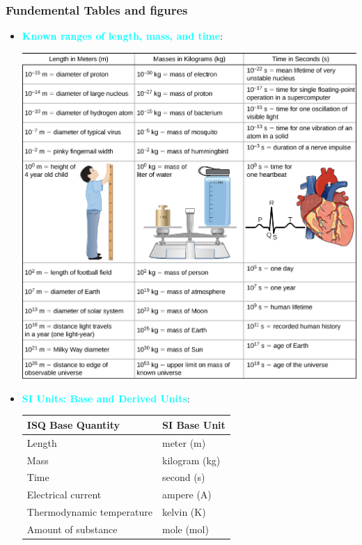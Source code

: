 \documentclass{report}
\begin{document}
    \subsubsection{Fundemental Tables and figures}
    \begin{itemize}
        \item \textbf{\textcolor{cyan}{Known ranges of length, mass, and time}}:
            \begin{center}
                \includegraphics[scale=.7]{./figures/physfig1.jpeg  }
            \end{center}
        \item \textbf{\textcolor{cyan}{SI Units: Base and Derived Units}}:
            \bigbreak \noindent 
            \begin{tabularx}{\textwidth}{|X|X|}
                \hline
                ISQ Base Quantity & SI Base Unit \\
                \hline
                Length & meter (m) \\
                Mass & kilogram (kg) \\
                Time & second (s) \\
                Electrical current & ampere (A) \\
                Thermodynamic temperature & kelvin (K) \\
                Amount of substance & mole (mol) \\

\end{tabularx}
\end{itemize}
\end{document}
